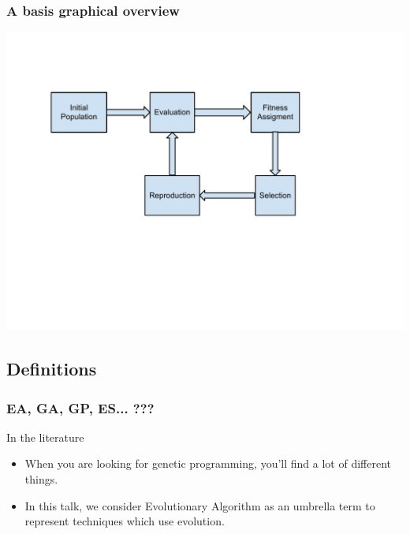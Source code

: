 \begin{frame}
  \frametitle{A basis graphical overview}
  \begin{center}
    \includegraphics[scale=0.5]{img/cycle}
  \end{center}
\end{frame}

\subsection{Definitions}

\begin{frame}
  \frametitle{EA, GA, GP, ES... ???}
  \begin{block}{In the literature}
    \begin{itemize}[<+->]
    \item When you are looking for genetic programming, you'll find a
      lot of different things.
    \item In this talk, we consider Evolutionary Algorithm as an
      umbrella term to represent techniques which use evolution.
    \end{itemize}
  \end{block}

\end{frame}

